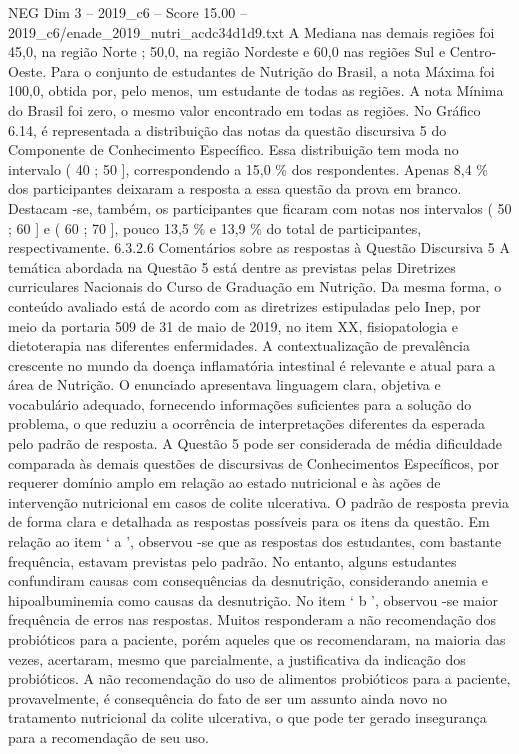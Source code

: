 \begin{textsample}{NEG Dim 3 – 2019\_c6 – Score 15.00 – 2019\_c6/enade\_2019\_nutri\_acdc34d1d9.txt}
A Mediana nas demais regiões foi 45,0, na região Norte ; 50,0, na região Nordeste e 60,0 nas regiões Sul e Centro-Oeste.
Para o conjunto de estudantes de Nutrição do Brasil, a nota Máxima foi 100,0, obtida por, pelo menos, um estudante de todas as regiões.
A nota Mínima do Brasil foi zero, o mesmo valor encontrado em todas as regiões.
No Gráfico 6.14, é representada a distribuição das notas da questão discursiva 5 do Componente de Conhecimento Específico.
Essa distribuição tem moda no intervalo ( 40 ; 50 ], correspondendo a 15,0 \% dos respondentes.
Apenas 8,4 \% dos participantes deixaram a resposta a essa questão da prova em branco.
Destacam -se, também, os participantes que ficaram com notas nos intervalos ( 50 ; 60 ] e ( 60 ; 70 ], pouco 13,5 \% e 13,9 \% do total de participantes, respectivamente. 6.3.2.6 Comentários sobre as respostas à Questão Discursiva 5 A temática abordada na Questão 5 está dentre as previstas pelas Diretrizes curriculares Nacionais do Curso de Graduação em Nutrição.
Da mesma forma, o conteúdo avaliado está de acordo com as diretrizes estipuladas pelo Inep, por meio da portaria 509 de 31 de maio de 2019, no item XX, fisiopatologia e dietoterapia nas diferentes enfermidades.
A contextualização de prevalência crescente no mundo da doença inflamatória intestinal é relevante e atual para a área de Nutrição.
O enunciado apresentava linguagem clara, objetiva e vocabulário adequado, fornecendo informações suficientes para a solução do problema, o que reduziu a ocorrência de interpretações diferentes da esperada pelo padrão de resposta.
A Questão 5 pode ser considerada de média dificuldade comparada às demais questões de discursivas de Conhecimentos Específicos, por requerer domínio amplo em relação ao estado nutricional e às ações de intervenção nutricional em casos de colite ulcerativa.
O padrão de resposta previa de forma clara e detalhada as respostas possíveis para os itens da questão.
Em relação ao item ‘ a ’, observou -se que as respostas dos estudantes, com bastante frequência, estavam previstas pelo padrão.
No entanto, alguns estudantes confundiram causas com consequências da desnutrição, considerando anemia e hipoalbuminemia como causas da desnutrição.
No item ‘ b ’, observou -se maior frequência de erros nas respostas.
Muitos responderam a não recomendação dos probióticos para a paciente, porém aqueles que os recomendaram, na maioria das vezes, acertaram, mesmo que parcialmente, a justificativa da indicação dos probióticos.
A não recomendação do uso de alimentos probióticos para a paciente, provavelmente, é consequência do fato de ser um assunto ainda novo no tratamento nutricional da colite ulcerativa, o que pode ter gerado insegurança para a recomendação de seu uso.

\end{textsample}
